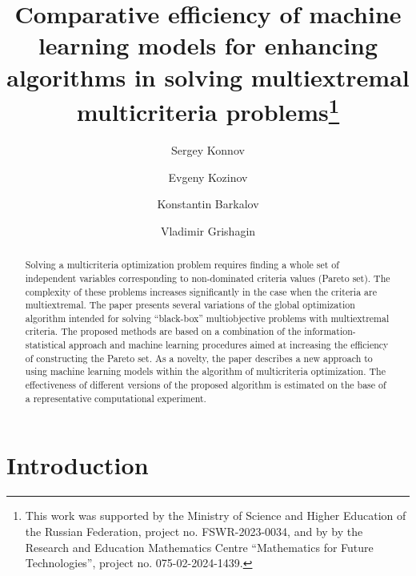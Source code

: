 \documentclass[runningheads]{llncs}
\begin{document}
%
\title{Comparative efficiency of machine learning models for enhancing algorithms in solving multiextremal multicriteria problems\thanks{This work was supported by the Ministry of Science and Higher Education of the Russian Federation, project no. FSWR-2023-0034, and by by the Research and Education Mathematics Centre ``Mathematics for Future Technologies'', project no. 075-02-2024-1439.} }
%
%
\author{Sergey Konnov \and
Evgeny Kozinov \Letter{} \and
Konstantin Barkalov  \and
Vladimir Grishagin}
%

%
\maketitle

%
\begin{abstract}
Solving a multicriteria optimization problem requires finding a whole set of independent variables corresponding to non-dominated criteria values (Pareto set). The complexity of these problems increases significantly in the case when the criteria are multiextremal. The paper presents several variations of the global optimization algorithm intended for solving ``black-box'' multiobjective problems with multiextremal criteria. The proposed methods are based on a combination of the information-statistical approach and machine learning procedures aimed at increasing the efficiency of constructing the Pareto set. As a novelty, the paper describes a new approach to using machine learning models within the algorithm of multicriteria optimization. The effectiveness of different versions of the proposed algorithm is estimated on the base of a representative computational experiment.

\end{abstract}
%
%
%
\section{Introduction}
\label{sec:1}
\end{document}
